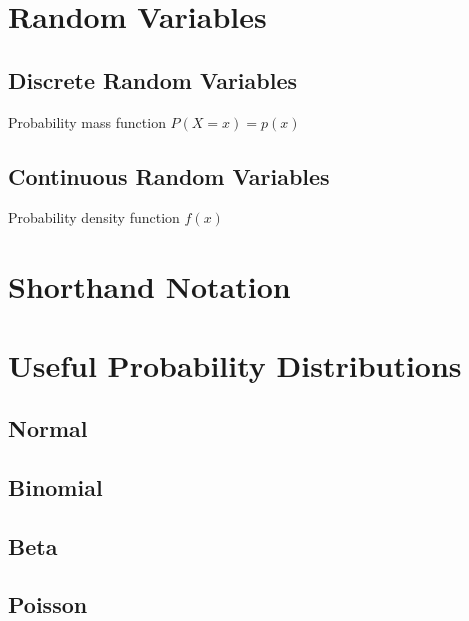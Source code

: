 \section{Random Variables}

\subsection{Discrete Random Variables}
Probability mass function
$P(X=x) = p(x)$


\subsection{Continuous Random Variables}
Probability density function
$f(x)$


\section{Shorthand Notation}



\section{Useful Probability Distributions}

\subsection{Normal}


\subsection{Binomial}


\subsection{Beta}


\subsection{Poisson}



